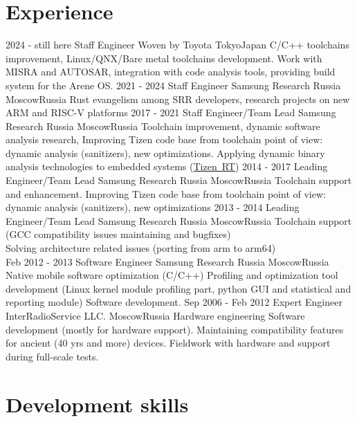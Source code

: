 \documentclass[11pt,a4paper]{moderncv}
\begin{document}
\section{Experience}
\cventry
  {2024 - still here}
  {Staff Engineer}
  {Woven by Toyota}
  {Tokyo}{Japan}
  {C/C++ toolchains improvement, Linux/QNX/Bare metal toolchains
    development. Work with MISRA and AUTOSAR, integration with code analysis
    tools, providing build system for the Arene OS.}
\cventry
  {2021 - 2024}
  {Staff Engineer}
  {Samsung Research Russia}
  {Moscow}{Russia}
  {Rust evangelism among SRR developers, research projects on new ARM and RISC-V platforms}
\cventry
  {2017 - 2021}
  {Staff Engineer/Team Lead}
  {Samsung Research Russia}
  {Moscow}{Russia}
  {Toolchain improvement, dynamic software analysis research, Improving Tizen
    code base from toolchain point of view: dynamic analysis (sanitizers), new
    optimizations. Applying dynamic binary analysis technologies to embedded
    systems (\href{https://github.com/Samsung/TizenRT}{Tizen~RT})}
\cventry
  {2014 - 2017}
  {Leading Engineer/Team Lead}
  {Samsung Research Russia}
  {Moscow}{Russia}
  {Toolchain support and enhancement. Improving Tizen code base from toolchain point of view: dynamic analysis
    (sanitizers), new optimizations}
\cventry
  {2013 - 2014}
  {Leading Engineer/Team Lead}
  {Samsung Research Russia}
  {Moscow}{Russia}
  {Toolchain support (GCC compatibility issues maintaining and bugfixes)\\
Solving architecture related issues (porting from arm to arm64)\\}
\cventry
  {Feb 2012 - 2013}
  {Software Engineer}
  {Samsung Research Russia}
  {Moscow}{Russia}
  {Native mobile software optimization (C/C++)\newline{}
Profiling and optimization tool development (Linux kernel module profiling part, python GUI and statistical and reporting module)\newline{}
Software development.}
\cventry
  {Sep 2006 - Feb 2012}
  {Expert Engineer}
  {InterRadioService LLC.}
  {Moscow}{Russia}
  {Hardware engineering\newline{}
Software development (mostly for hardware support).\newline{}
Maintaining compatibility features for ancient (40 yrs and more) devices.\newline{}
Fieldwork with hardware and support during full-scale tests.\newline{}}

\section{Development skills}
\end{document}
